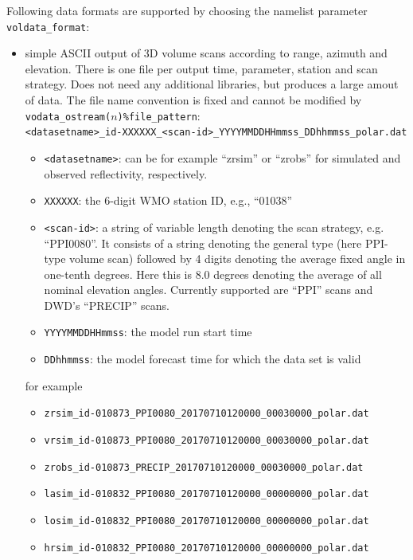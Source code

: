 \documentclass[10pt,a4paper,twoside,headinclude,footinclude,parskip=half]{scrartcl}
\newcommand{\srcform}[1]{\mbox{\texttt{#1}}\xspace}%
\newcommand{\paramform}[1]{\mbox{\texttt{#1}}\xspace}%
\begin{document}
Following data formats are supported by choosing the namelist parameter \srcform{voldata_format}:
  \begin{itemize}
  \item[\textbf{'ascii'}:] simple ASCII output of 3D volume scans according to range, azimuth and elevation.
    There is one file per output time, parameter, station and scan strategy. Does not need any additional libraries, but
    produces a large amout of data. The file name convention is fixed and cannot be modified by \paramform{vodata_ostream($n$)\%file_pattern}:\\[0.5em]
    \verb|<datasetname>_id-XXXXXX_<scan-id>_YYYYMMDDHHmmss_DDhhmmss_polar.dat|
    \begin{itemize}
      \item \verb|<datasetname>|: can be for example ``zrsim'' or ``zrobs'' for simulated and observed reflectivity, respectively.    
      \item \verb|XXXXXX|: the 6-digit WMO station ID, e.g., ``01038''
      \item \verb|<scan-id>|: a string of variable length denoting the scan strategy, e.g. ``PPI0080''. It consists of a string denoting
        the general type (here PPI-type volume scan) followed by 4 digits denoting the average fixed angle in one-tenth degrees. 
        Here this is 8.0 degrees denoting the average of all nominal elevation angles. Currently supported are ``PPI'' scans and DWD's ``PRECIP'' scans.
      \item \verb|YYYYMMDDHHmmss|: the model run start time
      \item \verb|DDhhmmss|: the model forecast time for which the data set is valid
    \end{itemize}
    for example
    \begin{itemize}
      \item \verb|zrsim_id-010873_PPI0080_20170710120000_00030000_polar.dat|
      \item \verb|vrsim_id-010873_PPI0080_20170710120000_00030000_polar.dat|
      \item \verb|zrobs_id-010873_PRECIP_20170710120000_00030000_polar.dat|
      \item \verb|lasim_id-010832_PPI0080_20170710120000_00000000_polar.dat|
      \item \verb|losim_id-010832_PPI0080_20170710120000_00000000_polar.dat|
      \item \verb|hrsim_id-010832_PPI0080_20170710120000_00000000_polar.dat|
    \end{itemize}

\end{itemize}
\end{document}
